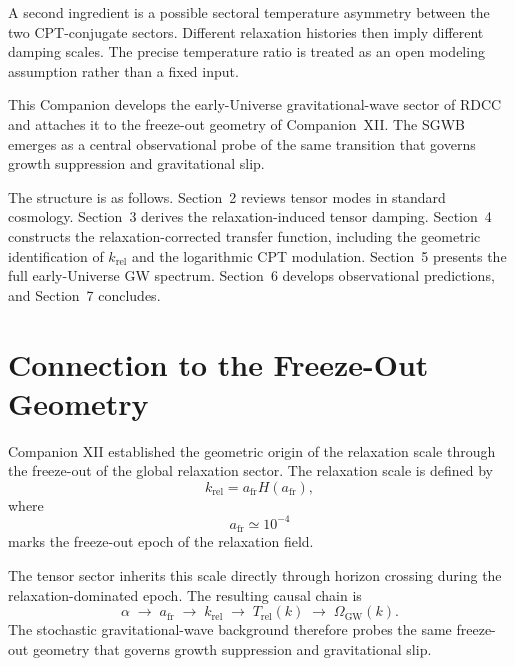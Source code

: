 \documentclass[11pt,a4paper]{article}
\begin{document}
A second ingredient is a possible sectoral temperature asymmetry between the
two CPT-conjugate sectors. Different relaxation histories then imply
different damping scales. The precise temperature ratio is treated as an
open modeling assumption rather than a fixed input.

This Companion develops the early-Universe gravitational-wave sector of
RDCC and attaches it to the freeze-out geometry of Companion~XII. The SGWB
emerges as a central observational probe of the same transition that
governs growth suppression and gravitational slip.

The structure is as follows. Section~2 reviews tensor modes in standard
cosmology. Section~3 derives the relaxation-induced tensor damping.
Section~4 constructs the relaxation-corrected transfer function, including
the geometric identification of \(k_{\mathrm{rel}}\) and the logarithmic
CPT modulation. Section~5 presents the full early-Universe GW spectrum.
Section~6 develops observational predictions, and Section~7 concludes.

\section{Connection to the Freeze-Out Geometry}

Companion XII established the geometric origin of the relaxation scale
through the freeze-out of the global relaxation sector. The relaxation
scale is defined by
\begin{equation}
  k_{\mathrm{rel}}
  =
  a_{\mathrm{fr}} H(a_{\mathrm{fr}}),
\end{equation}
where
\begin{equation}
  a_{\mathrm{fr}}
  \simeq
  10^{-4}
\end{equation}
marks the freeze-out epoch of the relaxation field.

The tensor sector inherits this scale directly through horizon crossing
during the relaxation-dominated epoch. The resulting causal chain is
\begin{equation}
  \alpha
  \;\rightarrow\;
  a_{\mathrm{fr}}
  \;\rightarrow\;
  k_{\mathrm{rel}}
  \;\rightarrow\;
  T_{\mathrm{rel}}(k)
  \;\rightarrow\;
  \Omega_{\mathrm{GW}}(k).
\end{equation}
The stochastic gravitational-wave background therefore probes the same
freeze-out geometry that governs growth suppression and gravitational slip.
\end{document}
